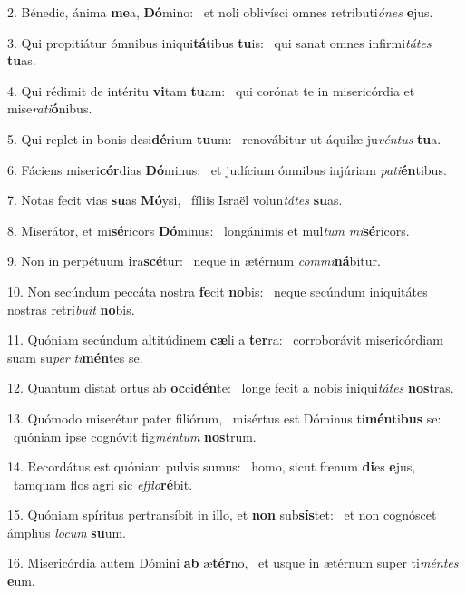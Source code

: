 2. Bénedic, ánima \textbf{me}a, \textbf{Dó}mino: \ast\  et noli oblivísci omnes retributi\textit{ó}\textit{nes} \textbf{e}jus.\

3. Qui propitiátur ómnibus iniqui\textbf{tá}tibus \textbf{tu}is: \ast\  qui sanat omnes infirmi\textit{tá}\textit{tes} \textbf{tu}as.\

4. Qui rédimit de intéritu \textbf{vi}tam \textbf{tu}am: \ast\  qui corónat te in misericórdia et mise\textit{ra}\textit{ti}\textbf{ó}nibus.\

5. Qui replet in bonis desi\textbf{dé}rium \textbf{tu}um: \ast\  renovábitur ut áquilæ ju\textit{vén}\textit{tus} \textbf{tu}a.\

6. Fáciens miseri\textbf{cór}dias \textbf{Dó}minus: \ast\  et judícium ómnibus injúriam \textit{pa}\textit{ti}\textbf{én}tibus.\

7. Notas fecit vias \textbf{su}as \textbf{Mó}ysi, \ast\  fíliis Israël volun\textit{tá}\textit{tes} \textbf{su}as.\

8. Miserátor, et mi\textbf{sé}ricors \textbf{Dó}minus: \ast\  longánimis et mul\textit{tum} \textit{mi}\textbf{sé}ricors.\

9. Non in perpétuum \textbf{i}ra\textbf{scé}tur: \ast\  neque in ætérnum \textit{com}\textit{mi}\textbf{ná}bitur.\

10. Non secúndum peccáta nostra \textbf{fe}cit \textbf{no}bis: \ast\  neque secúndum iniquitátes nostras retrí\textit{bu}\textit{it} \textbf{no}bis.\

11. Quóniam secúndum altitúdinem \textbf{cæ}li a \textbf{ter}ra: \ast\  corroborávit misericórdiam suam su\textit{per} \textit{ti}\textbf{mén}tes se.\

12. Quantum distat ortus ab \textbf{oc}ci\textbf{dén}te: \ast\  longe fecit a nobis iniqui\textit{tá}\textit{tes} \textbf{nos}tras.\

13. Quómodo miserétur pater filiórum, \dag\  misértus est Dóminus ti\textbf{mén}ti\textbf{bus} se: \ast\  quóniam ipse cognóvit fig\textit{mén}\textit{tum} \textbf{nos}trum.\

14. Recordátus est quóniam pulvis sumus: \dag\  homo, sicut fœnum \textbf{di}es \textbf{e}jus, \ast\  tamquam flos agri sic \textit{ef}\textit{flo}\textbf{ré}bit.\

15. Quóniam spíritus pertransíbit in illo, et \textbf{non} sub\textbf{sís}tet: \ast\  et non cognóscet ámplius \textit{lo}\textit{cum} \textbf{su}um.\

16. Misericórdia autem Dómini \textbf{ab} æ\textbf{tér}no, \ast\  et usque in ætérnum super ti\textit{mén}\textit{tes} \textbf{e}um.\


